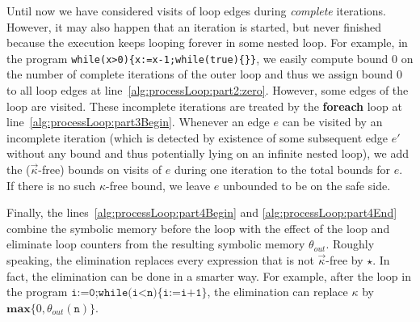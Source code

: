 \documentclass[10pt,a4paper]{article}
\newcommand{\var}[1]{\texttt{#1}}
\newcommand{\maxim}{\ensuremath{\mathbf{max}}}
\begin{document}

Until now we have considered visits of loop edges during \emph{complete}
iterations. However, it may also happen that an iteration is started, but
never finished because the execution keeps looping forever in some nested
loop. For example, in the program
\texttt{while(x>0)\{x:=x-1;while(true)\{\}\}}, we easily compute bound $0$
on the number of complete iterations of the outer loop and thus we assign
bound $0$ to all loop edges at
line~\ref{alg:processLoop:part2:zero}. However, some edges of the loop are
visited. These incomplete iterations are treated by the \textbf{foreach}
loop at line~\ref{alg:processLoop:part3Begin}. Whenever an edge $e$ can be
visited by an incomplete iteration (which is detected by existence of some
subsequent edge $e'$ without any bound and thus potentially lying on an
infinite nested loop), we add the ($\vec{\kappa}$-free) bounds on visits of
$e$ during one iteration to the total bounds for $e$. If there is no such
$\kappa$-free bound, we leave $e$ unbounded to be on the safe side.

Finally, the lines~\ref{alg:processLoop:part4Begin} and
\ref{alg:processLoop:part4End} combine the symbolic memory before the loop
with the effect of the loop and eliminate loop counters from the resulting
symbolic memory $\theta_\mathit{out}$. Roughly speaking, the elimination
replaces every expression that is not $\vec{\kappa}$-free by $\star$. In
fact, the elimination can be done in a smarter way. For example, after the
loop in the program $\texttt{i:=0;while(i<n)\{i:=i+1\}}$, the elimination
can replace $\kappa$ by $\maxim\{0,\theta_\mathit{out}(\var{n})\}$. 
\end{document}
